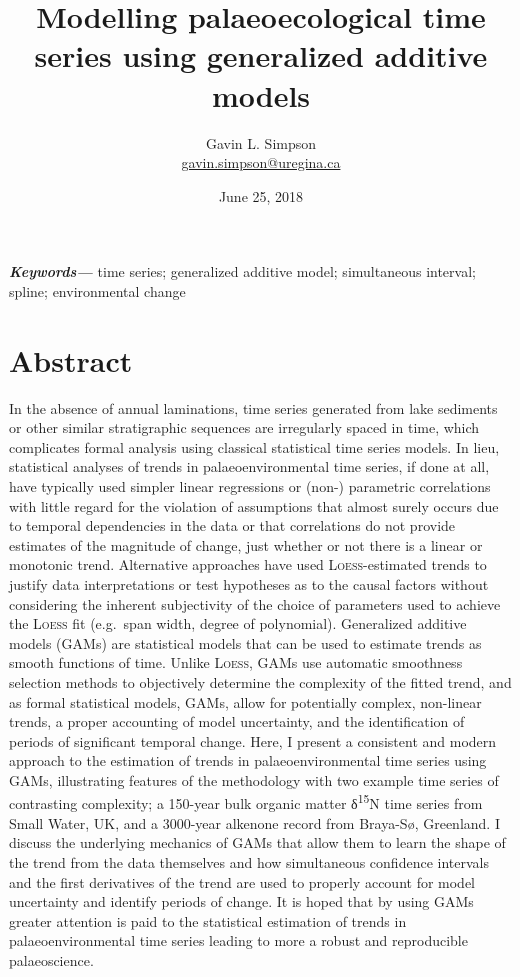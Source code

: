 \documentclass[12pt,]{article}
\title{Modelling palaeoecological time series using generalized additive models}
\author[1]{Gavin L. Simpson\\ \href{mailto:gavin.simpson@uregina.ca}{gavin.simpson@uregina.ca}}
\affil[1]{Institute of Environmental Change and Society, ~University of Regina,
Regina, Saskatchewan, Canada, S4S 0A2}
\date{June 25, 2018}
\newcommand{\loess}{\textsc{Loess}}
\begin{document}
\maketitle

\newcommand*{\keywords}[1]{\textbf{\textit{Keywords---}} #1}
    \keywords{time series; generalized additive model; simultaneous interval; spline;
environmental change}

\makeatletter
\def\fps@figure{tbp}
\makeatother


\section*{Abstract}\label{abstract}

In the absence of annual laminations, time series generated from lake
sediments or other similar stratigraphic sequences are irregularly
spaced in time, which complicates formal analysis using classical
statistical time series models. In lieu, statistical analyses of trends
in palaeoenvironmental time series, if done at all, have typically used
simpler linear regressions or (non-) parametric correlations with little
regard for the violation of assumptions that almost surely occurs due to
temporal dependencies in the data or that correlations do not provide
estimates of the magnitude of change, just whether or not there is a
linear or monotonic trend. Alternative approaches have used
\loess{}-estimated trends to justify data interpretations or test
hypotheses as to the causal factors without considering the inherent
subjectivity of the choice of parameters used to achieve the \loess{}
fit (e.g.~span width, degree of polynomial). Generalized additive models
(GAMs) are statistical models that can be used to estimate trends as
smooth functions of time. Unlike \loess{}, GAMs use automatic smoothness
selection methods to objectively determine the complexity of the fitted
trend, and as formal statistical models, GAMs, allow for potentially
complex, non-linear trends, a proper accounting of model uncertainty,
and the identification of periods of significant temporal change. Here,
I present a consistent and modern approach to the estimation of trends
in palaeoenvironmental time series using GAMs, illustrating features of
the methodology with two example time series of contrasting complexity;
a 150-year bulk organic matter δ\textsuperscript{15}N time series from
Small Water, UK, and a 3000-year alkenone record from Braya-Sø,
Greenland. I discuss the underlying mechanics of GAMs that allow them to
learn the shape of the trend from the data themselves and how
simultaneous confidence intervals and the first derivatives of the trend
are used to properly account for model uncertainty and identify periods
of change. It is hoped that by using GAMs greater attention is paid to
the statistical estimation of trends in palaeoenvironmental time series
leading to more a robust and reproducible palaeoscience.
\end{document}
